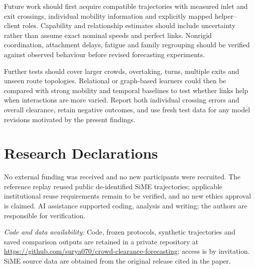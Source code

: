 \documentclass[conference]{IEEEtran}
\begin{document}
Future work should first acquire compatible trajectories with measured inlet and exit crossings, individual mobility information and explicitly mapped helper--client roles. Capability and relationship estimates should include uncertainty rather than assume exact nominal speeds and perfect links. Nonrigid coordination, attachment delays, fatigue and family regrouping should be verified against observed behaviour before revised forecasting experiments.

Further tests should cover larger crowds, overtaking, turns, multiple exits and unseen route topologies. Relational or graph-based learners could then be compared with strong mobility and temporal baselines to test whether links help when interactions are more varied. Report both individual crossing errors and overall clearance, retain negative outcomes, and use fresh test data for any model revisions motivated by the present findings.

\section*{Research Declarations}
No external funding was received and no new participants were recruited. The reference replay reused public de-identified SiME trajectories; applicable institutional reuse requirements remain to be verified, and no new ethics approval is claimed. AI assistance supported coding, analysis and writing; the authors are responsible for verification.

\textit{Code and data availability:} Code, frozen protocols, synthetic trajectories and saved comparison outputs are retained in a private repository at \url{https://github.com/surya070/crowd-clearance-forecasting}; access is by invitation. SiME source data are obtained from the original release cited in the paper.
\end{document}
